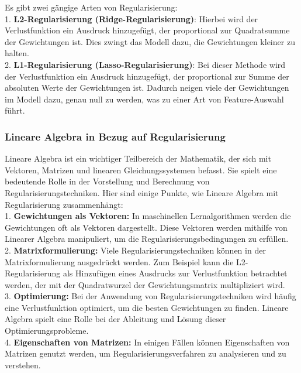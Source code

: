 \documentclass[12pt]{article}
\begin{document}
Es gibt zwei gängige Arten von Regularisierung:\\

1. \textbf{L2-Regularisierung (Ridge-Regularisierung)}: Hierbei wird der Verlustfunktion ein Ausdruck hinzugefügt, der proportional zur Quadratsumme der Gewichtungen ist. Dies zwingt das Modell dazu, die Gewichtungen kleiner zu halten.\\

2. \textbf{L1-Regularisierung (Lasso-Regularisierung)}: Bei dieser Methode wird der Verlustfunktion ein Ausdruck hinzugefügt, der proportional zur Summe der absoluten Werte der Gewichtungen ist. Dadurch neigen viele der Gewichtungen im Modell dazu, genau null zu werden, was zu einer Art von Feature-Auswahl führt.\\

\subsubsection{Lineare Algebra in Bezug auf Regularisierung}
Lineare Algebra ist ein wichtiger Teilbereich der Mathematik, der sich mit Vektoren, Matrizen und linearen Gleichungssystemen befasst. Sie spielt eine bedeutende Rolle in der Vorstellung und Berechnung von Regularisierungstechniken. Hier sind einige Punkte, wie Lineare Algebra mit Regularisierung zusammenhängt:\\

1. \textbf{Gewichtungen als Vektoren:} In maschinellen Lernalgorithmen werden die Gewichtungen oft als Vektoren dargestellt. Diese Vektoren werden mithilfe von Linearer Algebra manipuliert, um die Regularisierungsbedingungen zu erfüllen.\\

2. \textbf{Matrixformulierung:} Viele Regularisierungstechniken können in der Matrixformulierung ausgedrückt werden. Zum Beispiel kann die L2-Regularisierung als Hinzufügen eines Ausdrucks zur Verlustfunktion betrachtet werden, der mit der Quadratwurzel der Gewichtungsmatrix multipliziert wird.\\

3. \textbf{Optimierung:} Bei der Anwendung von Regularisierungstechniken wird häufig eine Verlustfunktion optimiert, um die besten Gewichtungen zu finden. Lineare Algebra spielt eine Rolle bei der Ableitung und Lösung dieser Optimierungsprobleme.\\

4. \textbf{Eigenschaften von Matrizen:} In einigen Fällen können Eigenschaften von Matrizen genutzt werden, um Regularisierungsverfahren zu analysieren und zu verstehen.\\[0.15cm]
\end{document}
